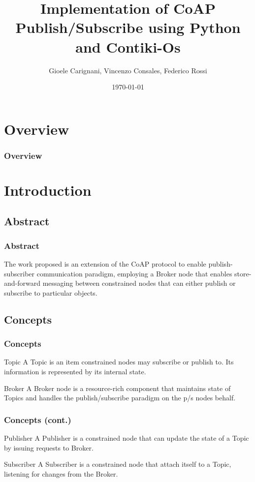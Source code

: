 \documentclass{beamer}
\title[CoAP P/S]{Implementation of CoAP Publish/Subscribe using Python and Contiki-Os}
\author[G. Carignani\\V. Consales\\F. Rossi]{Gioele Carignani, Vincenzo Consales, Federico Rossi}
\institute[UNIPI] 
{
University of Pisa \\ 
}
\date{\today}
\begin{document}
\begin{frame}
\titlepage 
\end{frame}

\section{Overview}
\begin{frame}
\frametitle{Overview}
\tableofcontents 
\end{frame}


\section{Introduction}

\subsection{Abstract} 
\begin{frame}
\frametitle{Abstract}
The work proposed is an extension of the CoAP protocol to enable publish-subscriber communication paradigm, employing a Broker node that enables store-and-forward messaging between constrained
nodes that can either publish or subscribe to particular objects.
\end{frame}

\subsection{Concepts}
\begin{frame}
\frametitle{Concepts}
\begin{block}{Topic}
A Topic is an item constrained nodes may subscribe or publish to. Its information is represented by its internal state.
\end{block}
\pause
\begin{block}{Broker}
A Broker node is a resource-rich component that maintains state of Topics and handles the publish/subscribe paradigm on the p/s nodes behalf.
\end{block}
\end{frame}

\begin{frame}
\frametitle{Concepts (cont.)}
\begin{block}{Publisher}
A Publisher is a constrained node that can update the state of a Topic by issuing requests to Broker.
\end{block}
\pause
\begin{block}{Subscriber}
A Subscriber is a constrained node that attach itself to a Topic, listening for changes from the Broker.
\end{block}
\end{frame}
\end{document}
